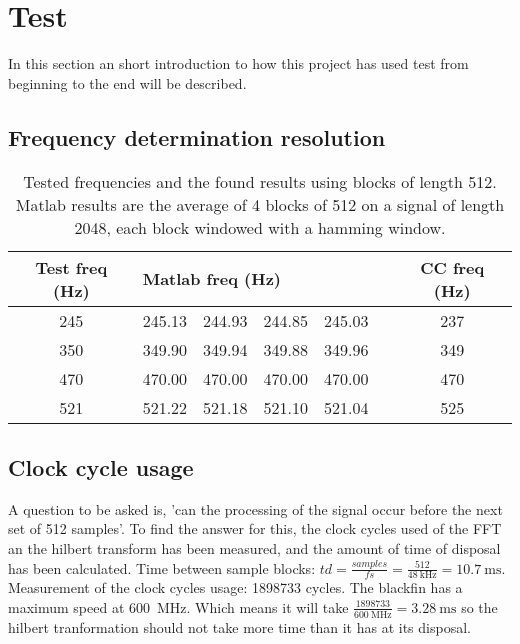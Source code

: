 
\section{Test}
\label{sec:test}
In this section an short introduction to how this project has used test from beginning to the end will be described.
\subsection{Frequency determination resolution}
\begin{table}
	\centering
	\begin{tabular}{c | c c c c c | c}
		\toprule
		Test freq (Hz) & \multicolumn{4}{l}{Matlab freq (Hz)} & & CC freq (Hz) \\
		\midrule
		\num{245} & \num{245.13} & \num{244.93} & \num{244.85} & \num{245.03} && \num{237}\\
		\num{350} & \num{349.90} & \num{349.94} & \num{349.88} & \num{349.96} && \num{349}\\
		\num{470} & \num{470.00} & \num{470.00} & \num{470.00} & \num{470.00} && \num{470} \\
		\num{521} & \num{521.22} & \num{521.18} & \num{521.10} & \num{521.04} && \num{525} \\
		\bottomrule
	\end{tabular}
	\caption{Tested frequencies and the found results using blocks of length \num{512}. Matlab results are the average of 4 blocks of \num{512} on a signal of length \num{2048}, each block windowed with a hamming window.}
	\label{tab:test}
\end{table}

\subsection{Clock cycle usage}
A question to be asked is, 'can the processing of the signal occur before the next set of 512 samples'. To find the answer for this, the clock cycles used of the FFT an the hilbert transform has been measured, and the amount of time of disposal has been calculated.\newline
Time between sample blocks: $td = \frac{samples}{fs} = \frac{512}{\SI{48}{\kilo\hertz}} = \SI{10.7}{\milli\second}$. \newline
Measurement of the clock cycles usage: \num{1898733} cycles. \newline
The blackfin has a maximum speed at \SI{600}{\mega\hertz}. Which means it will take $\frac{\num{1898733}}{\SI{600}{\mega\hertz}} = {\SI{3.28}{\milli\second}}$ so the hilbert tranformation should not take more time than it has at its disposal.


\FloatBarrier